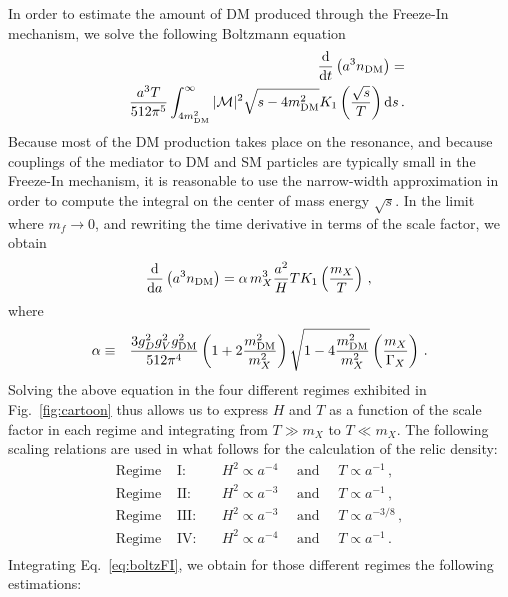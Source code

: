 \documentclass[aps,prd,reprint,twocolumn,preprintnumbers,floatfix,nofootinbib]{revtex4-1}
\newcommand{\be}{\begin{equation}}
\newcommand{\ee}{\end{equation}}
\newcommand{\bea}{\begin{eqnarray}}
\newcommand{\eea}{\end{eqnarray}}
\newcommand{\dd}{\text{d}}
\begin{document}
In order to estimate the amount of DM produced through the Freeze-In mechanism, we solve the following Boltzmann equation
\bea
&&\frac{\dd}{\dd t}\left(a^3 n_{\rm DM}\right)=\nonumber\\
&&\frac{a^3T}{512\pi^5}\int_{4m_{\rm DM}^2}^\infty |\mathcal M|^2\sqrt{s-4m_{\rm DM}^2}K_1\left(\frac{\sqrt{s}}{T}\right)\dd s\,.\nonumber\\
\eea
Because most of the DM production takes place on the resonance, and because couplings of the mediator to DM and SM particles are typically small in the Freeze-In mechanism, it is reasonable to use the narrow-width approximation in order to compute the integral on the center of mass energy $\sqrt{s}$. In the limit where $m_f\to 0$, and rewriting the time derivative in terms of the scale factor, we obtain
\be\label{eq:boltzFI}
\frac{\dd}{\dd a}\left(a^3 n_{\rm DM}\right)=\alpha\, m_X^3 \frac{a^2}{H}T K_1\left(\frac{m_X}{T}\right)\,,\nonumber\\
\ee
where
\bea
\alpha &\equiv&\frac{3 g_D^2 g_V^2 g_{\rm DM}^2}{512\pi^4}
\left(1+2\frac{m_{\rm DM}^2}{m_X^2}\right)\sqrt{1 - 4 \frac{m_{\rm DM}^2}{m_X^2}}\left(\frac{m_X}{\Gamma_X}\right)\,.\nonumber\\
\eea
Solving the above equation in the four different regimes exhibited in Fig.~\ref{fig:cartoon} thus allows us to express $H$ and $T$ as a function of the scale factor in each regime and integrating from $T\gg m_X$ to $T\ll m_X$. The following scaling relations are used in what follows for the calculation of the relic density:
\bea
\text{Regime } & \text{I:}\quad & H^2\propto a^{-4}\quad \text{ and }\quad T\propto a^{-1}\,,\nonumber\\
\text{Regime } & \text{II:} \quad & H^2\propto a^{-3}\quad \text{ and }\quad T\propto a^{-1}\,,\nonumber\\
\text{Regime } & \text{III:}\quad & H^2\propto a^{-3}\quad \text{ and }\quad T\propto a^{-3/8}\,,\nonumber\\
\text{Regime } & \text{IV:}\quad & H^2\propto a^{-4}\quad \text{ and }\quad T\propto a^{-1}\,.\nonumber\\
\eea
Integrating Eq.~\eqref{eq:boltzFI}, we obtain for those different regimes the following estimations:
\end{document}
